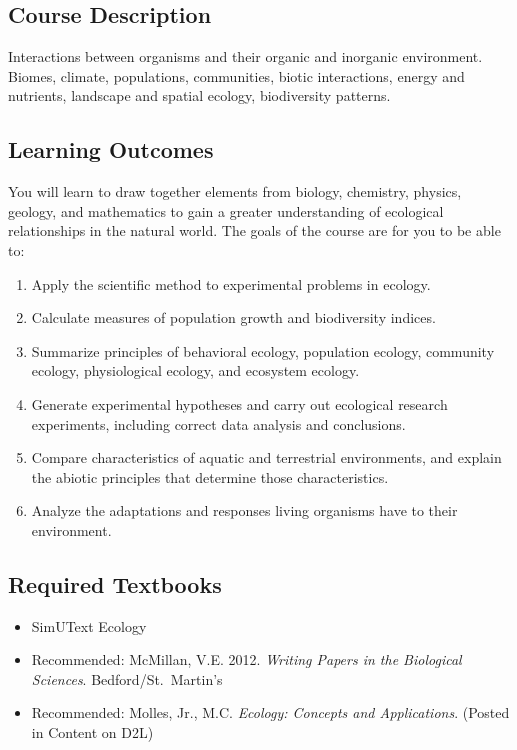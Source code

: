 \documentclass{tufte-handout}
\begin{document}
\begin{fullwidth}

\section{Course Description}

Interactions between organisms and their organic and inorganic environment. Biomes, climate, populations, communities, biotic interactions, energy and nutrients, landscape and spatial ecology, biodiversity patterns.

\subsection{Learning Outcomes}

You will learn to draw together elements from biology, chemistry, physics, geology, and mathematics to gain a greater understanding of ecological relationships in the natural world. The goals of the course are for you to be able to:


\begin{enumerate}
\item Apply the scientific method to experimental problems in ecology.
\item Calculate measures of population growth and biodiversity indices.
\item Summarize principles of behavioral ecology, population ecology, community ecology, physiological ecology, and ecosystem ecology.
\item Generate experimental hypotheses and carry out ecological research experiments, including correct data analysis and conclusions.
\item Compare characteristics of aquatic and terrestrial environments, and explain the abiotic principles that determine those characteristics.
\item Analyze the adaptations and responses living organisms have to their environment.
\end{enumerate}

\subsection{Required Textbooks}

\begin{itemize}
	\item SimUText Ecology
	\item Recommended: McMillan, V.E. 2012. \emph{Writing Papers in the Biological Sciences}. Bedford/St.\ Martin's
	\item Recommended: Molles, Jr., M.C. \emph{Ecology: Concepts and Applications}. (Posted in Content on D2L)
\end{itemize}


\end{fullwidth}
\end{document}
